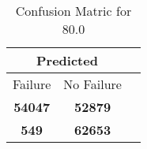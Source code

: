 \begin{table}[] 
\caption{Confusion Matric for 80.0} 
\label{Table: Prediction Accuracy-DMD80.0OnlySunEKF-combinationReflectionEKF-top2-Reflection} 
\centering 
\begin{tabular} 
 {@{}ccc@{}} 
\toprule 
\multicolumn{2}{c}{\textbf{Predicted}}
 \\ \midrule 
\multicolumn{1}{|c|}{Failure} & 
\multicolumn{1}{c|}{No Failure}
 \\ \midrule 
\multicolumn{1}{|c|}{\color{green}\textbf{54047}} & 
\multicolumn{1}{c|}{\color{red}\textbf{52879}}
 \\ \midrule 
\multicolumn{1}{|c|}{\color{red}\textbf{549}} & 
\multicolumn{1}{c|}{\color{green}\textbf{62653}}
 \\ \bottomrule 
\end{tabular} 
\end{table} 
